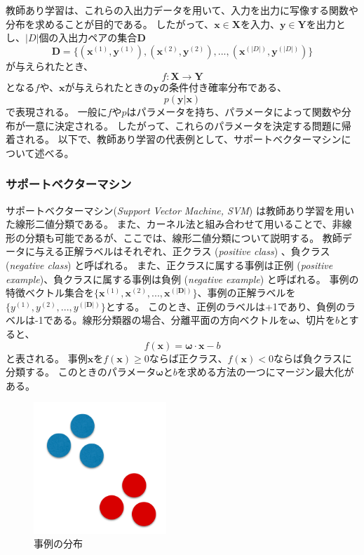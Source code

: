 \documentclass[titlepage,12pt]{jreport}
\begin{document}
教師あり学習は、これらの入出力データを用いて、入力を出力に写像する関数や分布を求めることが目的である。
したがって、\(\bm{x}\in \bm{X}\)を入力、\(\bm{y}\in \bm{Y}\)を出力とし、\(|D|\)個の入出力ペアの集合$\bm{D}$
\begin{equation}
	\bm{D} = \{(\bm{x}^{(1)},\bm{y}^{(1)}),(\bm{x}^{(2)},\bm{y}^{(2)}),...,(\bm{x}^{(|D|)},\bm{y}^{(|D|)})\}
\end{equation}
が与えられたとき、
\begin{equation}
	f:\bm{X}\to \bm{Y}
\end{equation}
となる\(f\)や、$\bm{x}$が与えられたときの\(\bm{y}\)の条件付き確率分布である、
\begin{equation}
	p(\bm{y}|\bm{x})
\end{equation}
で表現される。 一般に\(f\)や\(p\)はパラメータを持ち、パラメータによって関数や分布が一意に決定される。 したがって、これらのパラメータを決定する問題に帰着される。 以下で、教師あり学習の代表例として、サポートベクターマシンについて述べる。
\subsubsection{サポートベクターマシン}
サポートベクターマシン({\it Support Vector Machine, SVM}) は教師あり学習を用いた線形二値分類である\cite{support}。 また、カーネル法と組み合わせて用いることで、非線形の分類も可能であるが、ここでは、線形二値分類について説明する。 教師データに与える正解ラベルはそれぞれ、正クラス ({\it positive class}) 、負クラス ({\it negative class}) と呼ばれる。 また、正クラスに属する事例は正例 ({\it positive example})、負クラスに属する事例は負例 ({\it negative example}) と呼ばれる。 事例の特徴ベクトル集合を\(\{\bm{x}^{(1)},\bm{x}^{(2)},...,\bm{x}^{(|\bm{D}|)}\}\)、事例の正解ラベルを\(\{y^{(1)},y^{(2)},...,y^{(|\bm{D}|)}\}\)とする。 このとき、正例のラベルは+1であり、負例のラベルは-1である。線形分類器の場合、分離平面の方向ベクトルを\(\bm{\omega}\)、切片を\(b\)とすると、
\begin{equation}
f(\bm{x}) = \bm{\omega} \cdot \bm{x} - b
\end{equation}
と表される。 事例\(\bm{x}\)を\(f(\bm{x}) \geq 0\)ならば正クラス、\(f(\bm{x}) < 0\)ならば負クラスに分類する。 このときのパラメータ\(\bm{\omega}\)と\(b\)を求める方法の一つにマージン最大化がある。


\begin{figure}[b]
\centering
\includegraphics[width = 50mm,bb = 0 0 259 257]{img/svm1.png}

\caption{事例の分布}
\label{fig:one}
\end{figure}
\end{document}
